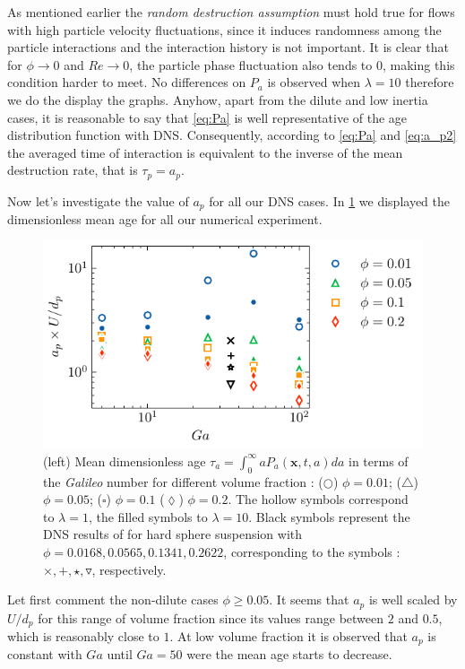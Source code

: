 As mentioned earlier the \textit{random destruction assumption} must hold true for flows with high particle velocity fluctuations, since it induces randomness among the particle interactions \citep{zhang2023evolution} and the interaction history is not important.  
It is clear that for $\phi \to 0$ and $Re \to 0$, the particle phase fluctuation also tends to $0$, making this condition harder to meet. 
No differences on $P_a$ is observed when $\lambda = 10 $ therefore we do the display the graphs. 
Anyhow, apart from the dilute and low inertia cases, it is reasonable to say that \ref{eq:Pa} is well representative of the age distribution function with DNS.
Consequently, according to \ref{eq:Pa} and \ref{eq:a_p2} the averaged time of interaction is equivalent to the inverse of the mean destruction rate, that is $\tau_p = a_p$. 

Now let's investigate the value of $a_p$ for all our DNS cases. 
In \ref{fig:tau_p} we displayed the dimensionless mean age for all our numerical experiment. 
\begin{figure}[h!]
    \centering
    \includegraphics[height = 0.3\textwidth]{image/HOMOGENEOUS_NEW/PA/age.pdf}
    \caption{
    (left) Mean dimensionless age $\tau_a =  \int_0^\infty aP_a(\textbf{x},t,a)da$ in terms of the \textit{Galileo} number for different volume fraction :   
    ($\pmb\bigcirc$) $\phi = 0.01$; ($\pmb\triangle$) $ \phi = 0.05$; ($\pmb\square$) $\phi = 0.1$ ($\pmb\lozenge$) $\phi = 0.2$.
    The hollow symbols correspond to $\lambda = 1$, the filled symbols to $\lambda = 10$.
    Black symbols represent the DNS results of \citet{zhang2023evolution} for hard sphere suspension with $\phi = 0.0168,0.0565,0.1341,0.2622$, corresponding to the symbols : $\pmb\times, \pmb +, \pmb\star , \pmb\triangledown$, respectively.
    }
    \label{fig:tau_p}
\end{figure}
Let first comment the non-dilute cases $\phi\geq 0.05$. 
It seems that $a_p$ is well scaled by $U/d_p$ for this range of volume fraction since its values range between $2$ and $0.5$, which is reasonably close to $1$. 
At low volume fraction it is observed that $a_p$ is constant with $Ga$ until $Ga = 50$ were the mean age starts to decrease. 


